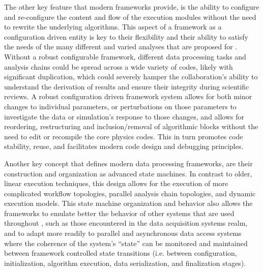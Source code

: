 \documentclass[../main-v1.tex]{subfiles}
\begin{document}
The other key feature that modern frameworks provide, is the ability to configure and re-configure the content and flow of the execution modules without the need to rewrite the underlying algorithms.  This aspect of a framework as a configuration driven entity is key to their flexibility and their ability to satisfy the needs of the many different and varied analyses that are proposed for .  Without a robust configurable framework, different data processing tasks and analysis chains could be spread across a wide variety of codes, likely with significant duplication, which could severely hamper the collaboration's ability to understand the derivation of results and ensure their integrity during scientific reviews.  A robust configuration driven framework system allows for both minor changes to individual parameters, or perturbations on those parameters to investigate the data or simulation's response to those changes, and allows for reordering, restructuring and inclusion/removal of algorithmic blocks without the need to edit or recompile the core physics codes.  This in turn promotes code stability, reuse, and facilitates modern code design and debugging principles.  

Another key concept that defines modern data processing frameworks, are their construction and organization as advanced state machines.  In contrast to older, linear execution techniques, this design allows for the execution of more complicated workflow topologies, parallel analysis chain topologies, and dynamic execution models.  This state machine organization and behavior also allows the frameworks to emulate better the behavior of other systems that are used throughout  , such as those encountered in the data acquisition systems realm, and to adapt more readily to parallel and asynchronous data access systems where the coherence of the system's ``state'' can be monitored and maintained between framework controlled state transitions (i.e. between configuration, initialization, algorithm execution, data serialization, and finalization stages).  
\end{document}
